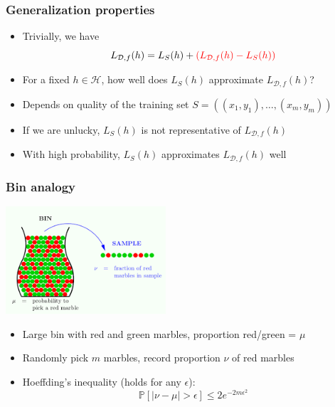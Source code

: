 \documentclass[10pt]{beamer}
\begin{document}
\begin{frame}
  \frametitle{Generalization properties}
  \begin{itemize}
	\item Trivially, we have
	\[L_{\mathcal{D},f}(h) = L_S(h) + {\color{red} (L_{\mathcal{D},f}(h) - L_S(h))}\]
	\item For a fixed $h\in\mathcal{H}$, how well does $L_S(h)$ approximate $L_{\mathcal{D},f}(h)$?
	\item Depends on quality of the {\color{blue} training set $S=((x_1,y_1),\ldots,(x_m,y_m))$}
	\item If we are {\color{red} unlucky}, $L_S(h)$ is not representative of $L_{\mathcal{D},f}(h)$
	\item With {\color{green} high probability}, $L_S(h)$ approximates $L_{\mathcal{D},f}(h)$ well
  \end{itemize}
\end{frame}

\begin{frame}
  \frametitle{Bin analogy}
  \begin{center}
	\includegraphics[height=4cm]{images/bins.png}
  \end{center}
  \begin{itemize}
	\item Large bin with red and green marbles, proportion red/green = $\mu$
	\item Randomly pick $m$ marbles, record proportion $\nu$ of red marbles
	\item Hoeffding's inequality (holds for any $\epsilon$):
	\[
	\mathbb{P}\left[|\nu - \mu| > \epsilon\right] \leq 2 e^{-2m\epsilon^2}
	\]
  \end{itemize}
\end{frame}
\end{document}
